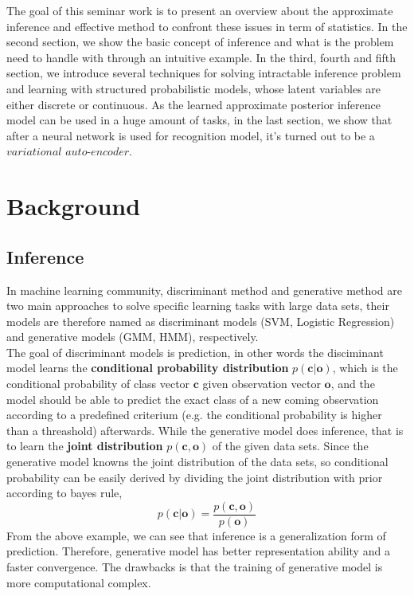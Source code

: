\documentclass[conference]{IEEEtran}
\begin{document}
The goal of this seminar work is to present an overview about the approximate inference and effective method to confront these issues in term of statistics. In the second section, we show the basic concept of inference and what is the problem need to handle with through an intuitive example. In the third, fourth and fifth section, we introduce several techniques for solving intractable inference problem and learning with structured probabilistic models, whose latent variables are either discrete or continuous. As the learned approximate posterior inference model can be used in a huge amount of tasks, in the last section, we show that after a neural network is used for recognition model, it's turned out to be a $variational$ $auto$-$encoder$.

\section{Background}
\subsection{Inference}
In machine learning community, discriminant method and generative method are two main approaches to solve specific learning tasks with large data sets, their models are therefore named as discriminant models (SVM, Logistic Regression) and generative models (GMM, HMM), respectively. \\

The goal of discriminant models is prediction, in other words the disciminant model learns the \textbf{conditional probability distribution} $p(\boldsymbol{c} | \boldsymbol{o})$, which is the conditional probability of class vector $\boldsymbol{c}$ given observation vector $\boldsymbol{o}$, and the model should be able to predict the exact class of a new coming observation according to a predefined criterium (e.g. the conditional probability is higher than a threashold) afterwards. While the generative model does inference, that is to learn the \textbf{joint distribution} $p(\boldsymbol{c},\boldsymbol{o})$ of the given data sets. Since the generative model knowns the joint distribution of the data sets, so conditional probability can be easily derived by dividing the joint distribution with prior according to bayes rule, 
\begin{equation}
p(\boldsymbol{c} | \boldsymbol{o}) = \frac{p(\boldsymbol{c}, \boldsymbol{o})}{p(\boldsymbol{o})}
\end{equation} From the above example, we can see that inference is a generalization form of prediction. Therefore, generative model has better representation ability and a faster convergence. The drawbacks is that the training of generative model is more computational complex.\\
\end{document}
